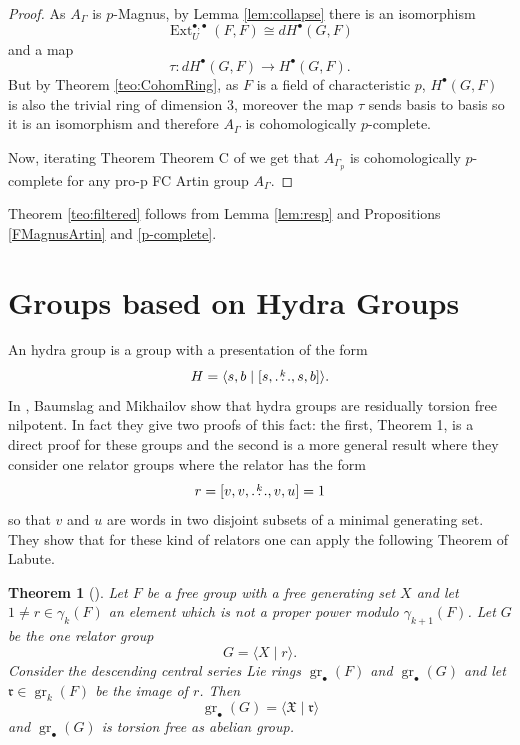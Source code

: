 \documentclass[10pt, oneside]{amsart}
\newcommand{\Ext}{\operatorname{Ext}}
\newcommand{\gr}{\operatorname{gr}} %
\newtheorem{theorem}{Theorem}[section]
\theoremstyle{definition}
\theoremstyle{remark}
\theoremstyle{plain}
\begin{document}
\begin{proof}
As $A_\Gamma$ is $p$-Magnus, by Lemma \ref{lem:collapse} there is an isomorphism
$$\Ext_U^{\bullet,\bullet}(F,F)\cong dH^\bullet(G,F)$$
and a map
$$\tau:dH^\bullet(G,F)\to H^\bullet(G,F).$$
But by Theorem \ref{teo:CohomRing}, as $F$ is a field of characteristic $p$, $H^\bullet(G,F)$ is also the trivial ring of dimension 3, moreover the map $\tau$ sends basis to basis so it is an isomorphism and therefore $A_\Gamma$ is cohomologically $p$-complete.

Now, iterating Theorem Theorem C of \cite{LMPW} we get that $A_{\Gamma_p}$ is cohomologically $p$-complete for any pro-p FC Artin group $A_\Gamma$.
\end{proof}
Theorem \ref{teo:filtered} follows from Lemma \ref{lem:resp} and Propositions \ref{FMagnusArtin} and \ref{p-complete}.





\section{Groups based on Hydra Groups}\label{sec:Hydra}


An hydra group is a group with a presentation of the form
\begin{equation}\label{eq:hydra} H=\langle s,b\mid[s,\buildrel k\over\ldots,s,b]\rangle.\end{equation}
In \cite{BM}, Baumslag and Mikhailov show that hydra groups are residually torsion free nilpotent. 
In fact they give two proofs of this fact: the first, Theorem 1, is a direct proof for these groups and the second is a more general result where they consider one relator groups where the relator has the form
$$r=[v,v,\buildrel k\over\ldots,v,u]=1$$
so that $v$ and $u$ are words in two disjoint subsets of a minimal generating set. They show that for these kind of relators one can apply the following Theorem of Labute.
\begin{theorem}[\cite{Labute2}]
    Let $F$ be a free group with a free generating set $X$ and let $1\neq r\in \gamma_k(F)$ an element which is not a proper power modulo $\gamma_{k+1}(F)$. Let $G$ be the one relator group 
$$G=\langle X\mid r\rangle.$$
Consider the descending central series Lie rings $\gr_\bullet(F)$ and $\gr_\bullet(G)$ and let $\mathfrak{r}\in\gr_k(F)$ be the image of $r$. Then
$$\gr_\bullet(G)=\langle \mathfrak{X}\mid\mathfrak{r}\rangle$$
and $\gr_\bullet(G)$ is torsion free as abelian group.
\end{theorem}
\end{document}
